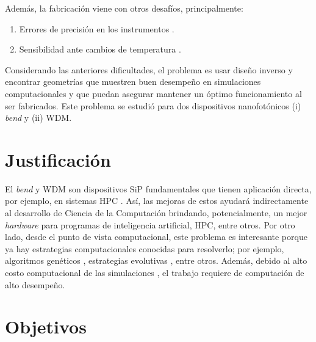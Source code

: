 Además, la fabricación viene con otros desafíos, principalmente:

\begin{enumerate}
  \item Errores de precisión en los instrumentos \citep{Piggott2017}.
  \item Sensibilidad ante cambios de temperatura \citep{Vuckovic2019}.
\end{enumerate}

Considerando las anteriores dificultades, el problema es usar diseño inverso y encontrar geometrías que muestren buen desempeño en simulaciones computacionales y que puedan asegurar mantener un óptimo funcionamiento al ser fabricados. 
Este problema se estudió para dos dispositivos nanofotónicos (i) \emph{bend} y (ii) WDM.

\section{Justificación}

El \emph{bend} y WDM son dispositivos SiP fundamentales que tienen aplicación
directa, por ejemplo, en sistemas HPC \citep{Shen2017}.
Así, las mejoras de estos ayudará indirectamente al desarrollo de Ciencia
de la Computación brindando, potencialmente, un mejor \emph{hardware} para programas de
inteligencia artificial, HPC, entre otros.
Por otro lado, desde el punto de vista computacional, 
este problema es interesante porque ya hay estrategias computacionales conocidas para resolverlo;
por ejemplo, algoritmos genéticos \citep{Mykel2019}, estrategias evolutivas \citep{Hansen2016}, entre otros.
Además, debido al alto costo computacional de las simulaciones \citep{Schneider2019}, el trabajo requiere de computación de alto desempeño.

\section{Objetivos}

